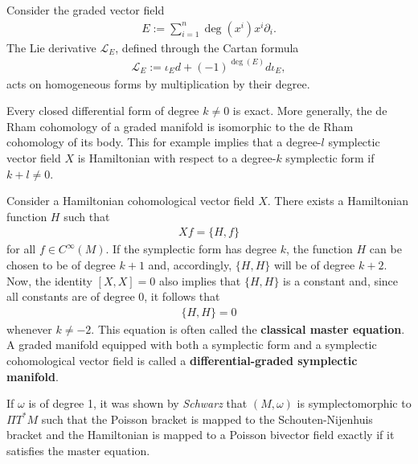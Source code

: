     \begin{property}
        Consider the graded vector field
        \begin{gather}
            E := \sum_{i=1}^n\deg(x^i)x^i\partial_i.
        \end{gather}
        The Lie derivative $\mathcal{L}_E$, defined through the Cartan formula
        \begin{gather}
            \mathcal{L}_E := \iota_Ed + (-1)^{\deg(E)}d\iota_E,
        \end{gather}
        acts on homogeneous forms by multiplication by their degree.
    \end{property}
    \begin{property}\label{hdg:global_exactness}
        Every closed differential form of degree $k\neq0$ is exact. More generally, the de Rham cohomology of a graded manifold is isomorphic to the de Rham cohomology of its body. This for example implies that a degree-$l$ symplectic vector field $X$ is Hamiltonian with respect to a degree-$k$ symplectic form if $k+l\neq0$.
    \end{property}
    \begin{result}
        Consider a Hamiltonian cohomological vector field $X$. There exists a Hamiltonian function $H$ such that
        \begin{gather}
            Xf = \{H,f\}
        \end{gather}
        for all $f\in C^\infty(M)$. If the symplectic form has degree $k$, the function $H$ can be chosen to be of degree $k+1$ and, accordingly, $\{H,H\}$ will be of degree $k+2$. Now, the identity $[X,X] = 0$ also implies that $\{H,H\}$ is a constant and, since all constants are of degree 0, it follows that
        \begin{gather}
            \label{hdg:classical_master_equation}
            \{H,H\}=0
        \end{gather}
        whenever $k\neq-2$. This equation is often called the \textbf{classical master equation}. A graded manifold equipped with both a symplectic form and a symplectic cohomological vector field is called a \textbf{differential-graded symplectic manifold}.

        If $\omega$ is of degree 1, it was shown by \textit{Schwarz} that $(M,\omega)$ is symplectomorphic to $\Pi T^*M$ such that the Poisson bracket is mapped to the Schouten-Nijenhuis bracket and the Hamiltonian is mapped to a Poisson bivector field exactly if it satisfies the master equation.
    \end{result}

